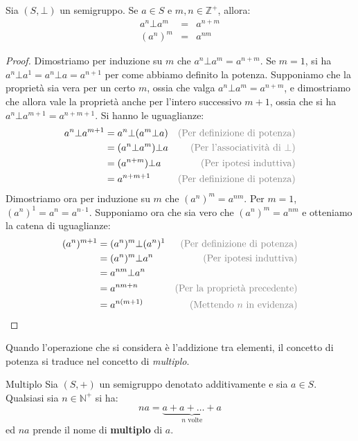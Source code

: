 \begin{propbox}
	Sia $(S,\bot)$ un semigruppo. Se $a \in S$ e $m,n \in \mathbb{Z}^{+}$, allora:
	\begin{eqnarray}
		a^{n} \bot a^{m} &=& a^{n+m} \\
		(a^{n})^{m} &=& a^{nm}
	\end{eqnarray}
\end{propbox}
\begin{proof}
	Dimostriamo per induzione su $m$ che $a^{n} \bot a^{m} = a^{n+m}$. Se $m=1$, si ha $a^{n} \bot a^{1}=a^{n} \bot a = a^{n+1}$ per come abbiamo definito la potenza. Supponiamo che la proprietà sia vera per un certo $m$, ossia che valga $a^{n}\bot a^{m}= a^{n+m}$, e dimostriamo che allora vale la proprietà anche per l'intero successivo $m+1$, ossia che si ha $a^{n}\bot a^{m+1}=a^{n+m+1}$. Si hanno le uguaglianze:
	\begin{align*}
		a^{n} \bot a^{m+1} &= a^{n} \bot (a^{m}\bot a) & \text{\textcolor{gray}{(Per definizione di potenza)}} \\
		&= (a^{n} \bot a^{m}) \bot a & \text{\textcolor{gray}{(Per l'associatività di $\bot$)}}\\
		&= (a^{n+m}) \bot a & \text{\textcolor{gray}{(Per ipotesi induttiva)}}\\
		&= a^{n+m+1} & \text{\textcolor{gray}{(Per definizione di potenza)}}
	\end{align*}
Dimostriamo ora per induzione su $m$ che $(a^{n})^{m}=a^{nm}$. Per $m=1$, $(a^{n})^{1}=a^{n}=a^{n\cdot1}$. Supponiamo ora che sia vero che $(a^{n})^{m}=a^{nm}$ e otteniamo la catena di uguaglianze:
\begin{align*}
	(a^{n})^{m+1} &= (a^{n})^{m} \bot (a^{n})^{1} & \text{\textcolor{gray}{(Per definizione di potenza)}} \\
	&=(a^{n})^{m} \bot a^{n} & \text{\textcolor{gray}{(Per ipotesi induttiva)}} \\
	&= a^{nm} \bot a^{n} \\
	&= a^{nm+n} & \text{\textcolor{gray}{(Per la proprietà precedente)}}\\
	&= a^{n(m+1)} & \text{\textcolor{gray}{(Mettendo $n$ in evidenza)}}
\end{align*}
\end{proof}
Quando l'operazione che si considera è l'addizione tra elementi, il concetto di potenza si traduce nel concetto di \textit{multiplo}.

\begin{defbox}{Multiplo}\label{def:multiplo}
	Sia $(S,+)$ un semigruppo denotato additivamente e sia $a \in S$. Qualsiasi sia $n \in \mathbb{N}^{+}$ si ha:
	\begin{equation}
		na = \underbrace{a + a + \ldots +a}_{\text{$n$ volte}}
	\end{equation}
	ed $na$ prende il nome di \textbf{multiplo} di $a$.
\end{defbox}

